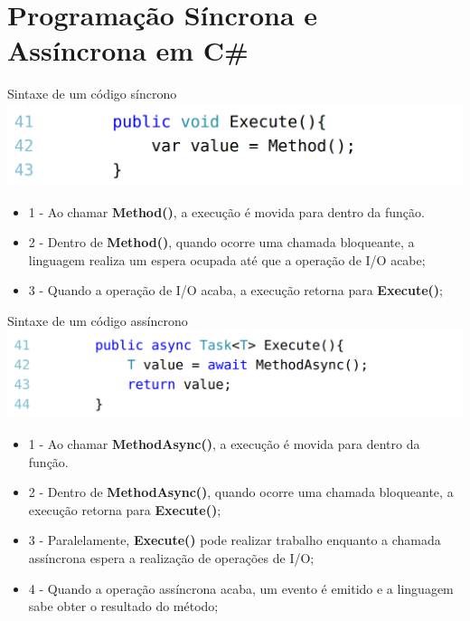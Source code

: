 \documentclass[10pt]{beamer}
\begin{document}
\section{Programação Síncrona e Assíncrona em C\#}

\begin{frame}{Sintaxe de um código síncrono}
	\includegraphics[scale=0.27]{imgs/00-sync.png}
	\vspace{0.5cm}
	
	\small
	\begin{itemize}
		\item 1 - Ao chamar \textbf{Method()}, a execução é movida para dentro da função.
		\item 2 - Dentro de \textbf{Method()}, quando ocorre uma chamada bloqueante, a linguagem realiza um espera ocupada até que a operação de I/O acabe;
		\item 3 - Quando a operação de I/O acaba, a execução retorna para \textbf{Execute()};
	\end{itemize}
\end{frame}

\begin{frame}{Sintaxe de um código assíncrono}
	\includegraphics[scale=0.27]{imgs/01-async.png}
	\vspace{0.1cm}
	
	\small
	\begin{itemize}
		\item 1 - Ao chamar \textbf{MethodAsync()}, a execução é movida para dentro da função.
		\item 2 - Dentro de \textbf{MethodAsync()}, quando ocorre uma chamada bloqueante, a execução retorna para \textbf{Execute()};
		\item 3 - Paralelamente, \textbf{Execute()} pode realizar trabalho enquanto a chamada assíncrona espera a realização de operações de I/O;
		\item 4 - Quando a operação assíncrona acaba, um evento é emitido e a linguagem sabe obter o resultado do método;
	\end{itemize}
\end{frame}
\end{document}
